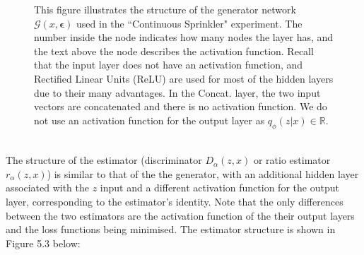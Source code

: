 \documentclass[honours,12pt]{unswthesis}
\newcommand{\R}{\mathbb{R}}
\numberwithin{equation}{section}
\theoremstyle{definition}
\begin{document}
\begin{figure}[h!]
\caption{\small This figure illustrates the structure of the generator network $\mathcal{G}(x,\bm{\epsilon})$ used in the ``Continuous Sprinkler" experiment. The number inside the node indicates how many nodes the layer has, and the text above the node describes the activation function. Recall that the input layer does not have an activation function, and Rectified Linear Units (ReLU) are used for most of the hidden layers due to their many advantages. In the Concat. layer, the two input vectors are concatenated and there is no activation function. We do not use an activation function for the output layer as $q_\phi(z|x)\in \R$.}
\end{figure}\\
The structure of the estimator (discriminator $D_\alpha(z,x)$ or ratio estimator $r_\alpha(z,x)$) is similar to that of the the generator, with an additional hidden layer associated with the $z$ input and a different activation function for the output layer, corresponding to the estimator's identity. Note that the only differences between the two estimators are the activation function of the their output layers and the loss functions being minimised. The estimator structure is shown in Figure 5.3 below:
\end{document}
